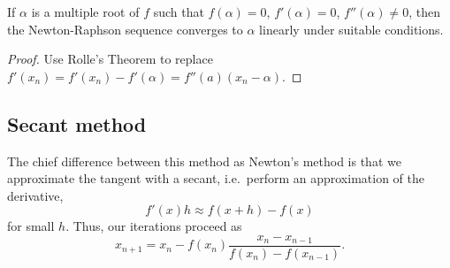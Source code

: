 \documentclass[11pt]{article}
\theoremstyle{definition}
\theoremstyle{remark}
\numberwithin{equation}{section}
\begin{document}
    \begin{theorem}
        If $\alpha$ is a multiple root of $f$ such that $f(\alpha) = 0$, $f'(\alpha)
        = 0$, $f''(\alpha) \neq 0$, then the Newton-Raphson sequence converges to
        $\alpha$ linearly under suitable conditions.
    \end{theorem}
    \begin{proof}
        Use Rolle's Theorem to replace $f'(x_n) = f'(x_n) - f'(\alpha) = f''(a)(x_n
        - \alpha)$.
    \end{proof}

    \subsection{Secant method}
    The chief difference between this method as Newton's method is that we
    approximate the tangent with a secant, i.e.\ perform an approximation of the
    derivative, \[
        f'(x)h \approx f(x + h) - f(x)
    \] for small $h$. Thus, our iterations proceed as \[
        x_{n + 1} = x_n - f(x_n) \frac{x_n - x_{n - 1}}{f(x_n) - f(x_{n - 1})}.
    \] 
\end{document}
